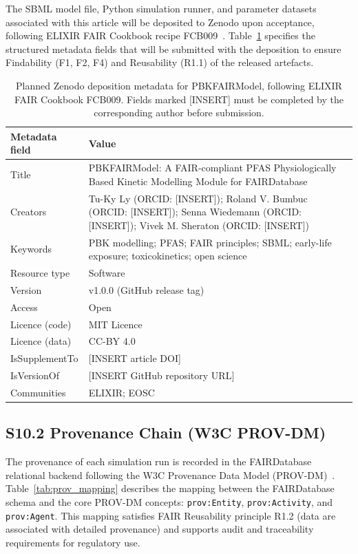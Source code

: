 \documentclass[12pt]{article}
\begin{document}
The SBML model file, Python simulation runner, and parameter datasets associated with this article will be deposited to Zenodo upon acceptance, following ELIXIR FAIR Cookbook recipe FCB009~\citep{rocca2023}. Table~\ref{tab:zenodo_meta} specifies the structured metadata fields that will be submitted with the deposition to ensure Findability (F1, F2, F4) and Reusability (R1.1) of the released artefacts.

\begin{table}[h]
\centering
\caption{Planned Zenodo deposition metadata for PBKFAIRModel, following ELIXIR FAIR Cookbook FCB009. Fields marked {[}INSERT{]} must be completed by the corresponding author before submission.}
\label{tab:zenodo_meta}
\begin{tabular}{p{3.5cm} p{10cm}}
\toprule
\textbf{Metadata field} & \textbf{Value} \\
\midrule
Title & PBKFAIRModel: A FAIR-compliant PFAS Physiologically Based Kinetic Modelling Module for FAIRDatabase \\
Creators & Tu-Ky Ly (ORCID: [INSERT]); Roland V. Bumbuc (ORCID: [INSERT]); Senna Wiedemann (ORCID: [INSERT]); Vivek M. Sheraton (ORCID: [INSERT]) \\
Keywords & PBK modelling; PFAS; FAIR principles; SBML; early-life exposure; toxicokinetics; open science \\
Resource type & Software \\
Version & v1.0.0 (GitHub release tag) \\
Access & Open \\
Licence (code) & MIT Licence \\
Licence (data) & CC-BY 4.0 \\
IsSupplementTo & [INSERT article DOI] \\
IsVersionOf & [INSERT GitHub repository URL] \\
Communities & ELIXIR; EOSC \\
\bottomrule
\end{tabular}
\end{table}

\subsection*{S10.2 Provenance Chain (W3C PROV-DM)}

The provenance of each simulation run is recorded in the FAIRDatabase relational backend following the W3C Provenance Data Model (PROV-DM)~\citep{rocca2023}. Table~\ref{tab:prov_mapping} describes the mapping between the FAIRDatabase schema and the core PROV-DM concepts: \texttt{prov:Entity}, \texttt{prov:Activity}, and \texttt{prov:Agent}. This mapping satisfies FAIR Reusability principle R1.2 (data are associated with detailed provenance) and supports audit and traceability requirements for regulatory use.
\end{document}
